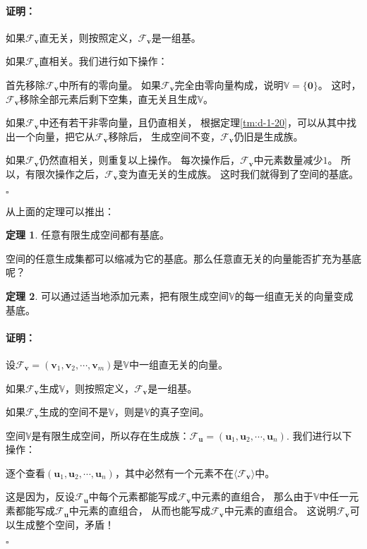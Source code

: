 \documentclass[12pt,UTF8]{ctexbook}
\theoremstyle{definition}
\newtheorem{tm}{定理}[section]
\theoremstyle{plain}
\renewenvironment{proof}{\paragraph{\textbf{证明：}}}{\hfill$\square$}
\begin{document}
\begin{appendix}
\begin{proof}
    如果$\mathcal{F}_{\mathbf{v}}$直无关，则按照定义，$\mathcal{F}_{\mathbf{v}}$是一组基。

    如果$\mathcal{F}_{\mathbf{v}}$直相关。我们进行如下操作：

    首先移除$\mathcal{F}_{\mathbf{v}}$中所有的零向量。
    如果$\mathcal{F}_{\mathbf{v}}$完全由零向量构成，说明$\mathbb{V} = \{\mathbf{0}\}$。
    这时，$\mathcal{F}_{\mathbf{v}}$移除全部元素后剩下空集，直无关且生成$\mathbb{V}$。

    如果$\mathcal{F}_{\mathbf{v}}$中还有若干非零向量，且仍直相关，
    根据定理\ref{tm:d-1-20}，可以从其中找出一个向量，把它从$\mathcal{F}_{\mathbf{v}}$移除后，
    生成空间不变，$\mathcal{F}_{\mathbf{v}}$仍旧是生成族。

    如果$\mathcal{F}_{\mathbf{v}}$仍然直相关，则重复以上操作。
    每次操作后，$\mathcal{F}_{\mathbf{v}}$中元素数量减少$1$。
    所以，有限次操作之后，$\mathcal{F}_{\mathbf{v}}$变为直无关的生成族。
    这时我们就得到了空间的基底。

\end{proof}

从上面的定理可以推出：
\begin{tm}\label{tm:d-1-50}
    任意有限生成空间都有基底。
\end{tm}

空间的任意生成集都可以缩减为它的基底。那么任意直无关的向量能否扩充为基底呢？
\begin{tm}\label{tm:d-1-60}
    可以通过适当地添加元素，把有限生成空间$\mathbb{V}$的每一组直无关的向量变成基底。
\end{tm}

\begin{proof}
    设$\mathcal{F}_{\mathbf{v}} = (\mathbf{v}_1, \mathbf{v}_2, \cdots , \mathbf{v}_m )$是$\mathbb{V}$中一组直无关的向量。

    如果$\mathcal{F}_{\mathbf{v}}$生成$\mathbb{V}$，则按照定义，$\mathcal{F}_{\mathbf{v}}$是一组基。

    如果$\mathcal{F}_{\mathbf{v}}$生成的空间不是$\mathbb{V}$，则是$\mathbb{V}$的真子空间。

    空间$\mathbb{V}$是有限生成空间，所以存在生成族：$\mathcal{F}_{\mathbf{u}} = (\mathbf{u}_1, \mathbf{u}_2, \cdots , \mathbf{u}_n )$. 我们进行以下操作：

    逐个查看$(\mathbf{u}_1, \mathbf{u}_2, \cdots , \mathbf{u}_n )$，其中必然有一个元素不在$\langle\mathcal{F}_{\mathbf{v}}\rangle$中。

    这是因为，反设$\mathcal{F}_{\mathbf{u}}$中每个元素都能写成$\mathcal{F}_{\mathbf{v}}$中元素的直组合，
    那么由于$\mathbb{V}$中任一元素都能写成$\mathcal{F}_{\mathbf{u}}$中元素的直组合，
    从而也能写成$\mathcal{F}_{\mathbf{v}}$中元素的直组合。
    这说明$\mathcal{F}_{\mathbf{v}}$可以生成整个空间，矛盾！


\end{proof}
\end{appendix}
\end{document}
